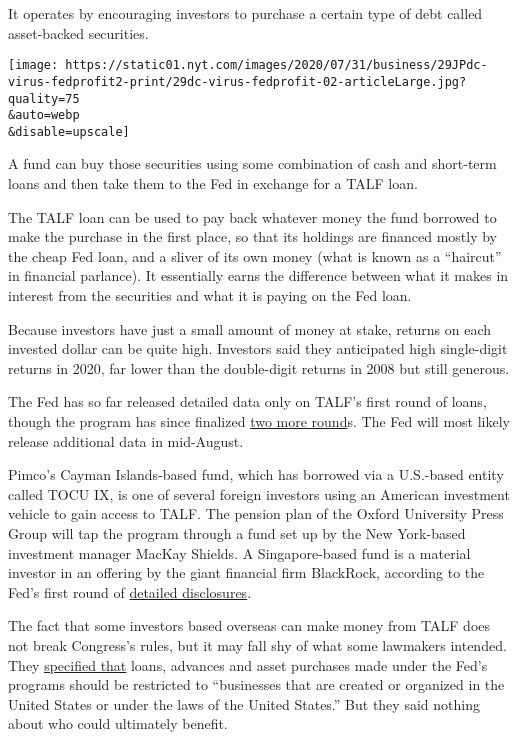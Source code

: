 It operates by encouraging investors to purchase a certain type of debt
called asset-backed securities.

\texttt{[image: https://static01.nyt.com/images/2020/07/31/business/29JPdc-virus-fedprofit2-print/29dc-virus-fedprofit-02-articleLarge.jpg?quality=75\\\&auto=webp\\\&disable=upscale]}

A fund can buy those securities using some combination of cash and
short-term loans and then take them to the Fed in exchange for a TALF
loan.

The TALF loan can be used to pay back whatever money the fund borrowed
to make the purchase in the first place, so that its holdings are
financed mostly by the cheap Fed loan, and a sliver of its own money
(what is known as a ``haircut'' in financial parlance). It essentially
earns the difference between what it makes in interest from the
securities and what it is paying on the Fed loan.

Because investors have just a small amount of money at stake, returns on
each invested dollar can be quite high. Investors said they anticipated
high single-digit returns in 2020, far lower than the double-digit
returns in 2008 but still generous.

The Fed has so far released detailed data only on TALF's first round of
loans, though the program has since finalized
\href{https://www.newyorkfed.org/markets/term-asset-backed-securities-loan-facility/term-asset-backed-securities-loan-facility-rates}{two
more round}s. The Fed will most likely release additional data in
mid-August.

Pimco's Cayman Islands-based fund, which has borrowed via a U.S.-based
entity called TOCU IX, is one of several foreign investors using an
American investment vehicle to gain access to TALF. The pension plan of
the Oxford University Press Group will tap the program through a fund
set up by the New York-based investment manager MacKay Shields. A
Singapore-based fund is a material investor in an offering by the giant
financial firm BlackRock, according to the Fed's first round of
\href{https://www.federalreserve.gov/reports-to-congress-covid-19.htm}{detailed
disclosures}.

The fact that some investors based overseas can make money from TALF
does not break Congress's rules, but it may fall shy of what some
lawmakers intended. They
\href{https://www.govinfo.gov/content/pkg/BILLS-116hr748enr/pdf/BILLS-116hr748enr.pdf}{specified
that} loans, advances and asset purchases made under the Fed's programs
should be restricted to ``businesses that are created or organized in
the United States or under the laws of the United States.'' But they
said nothing about who could ultimately benefit.

